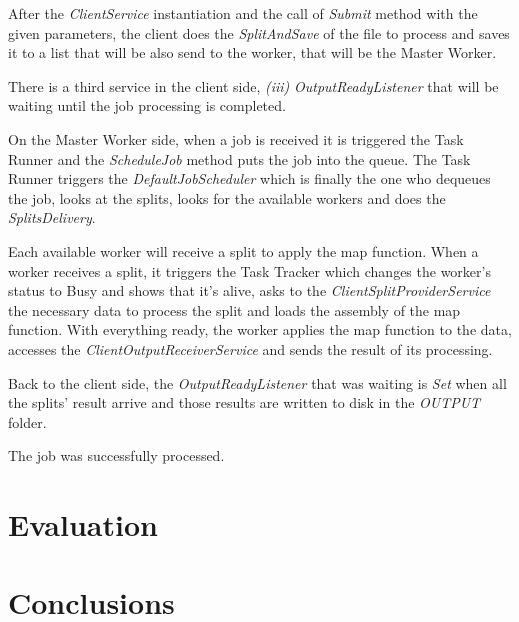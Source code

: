 \documentclass[times, 10pt,twocolumn]{article}
\begin{document}
            After the \emph{ClientService} instantiation and the call of \emph{Submit} method with the given parameters, the client does the \emph{SplitAndSave} of the file to process and saves it to a list that will be also send to the worker, that will be the Master Worker.

            There is a third service in the client side, {\it (iii)} \emph{OutputReadyListener} that will be waiting until the job processing is completed.

            On the Master Worker side, when a job is received it is triggered the Task Runner and the \emph{ScheduleJob} method puts the job into the queue. The Task Runner triggers the \emph{DefaultJobScheduler} which is finally the one who dequeues the job, looks at the splits, looks for the available workers and does the \emph{SplitsDelivery}.

            Each available worker will receive a split to apply the map function. When a worker receives a split, it triggers the Task Tracker which changes the worker's status to Busy and shows that it's alive, asks to the \emph{ClientSplitProviderService} the necessary data to process the split and loads the assembly of the map function. With everything ready, the worker applies the map function to the data, accesses the \emph{ClientOutputReceiverService} and sends the result of its processing.

            Back to the client side, the \emph{OutputReadyListener} that was waiting is \emph{Set} when all the splits' result arrive and those results are written to disk in the \emph{OUTPUT} folder.

            The job was successfully processed.
	\section{Evaluation}

	\section{Conclusions}

	
	
\end{document}
